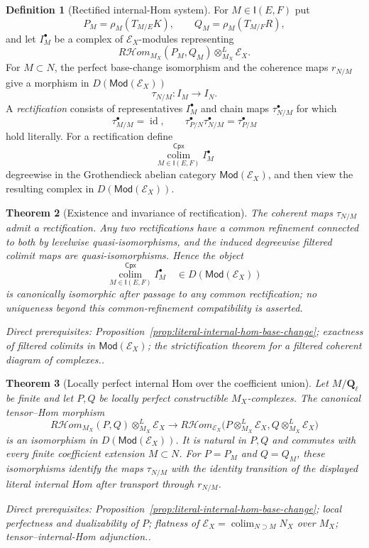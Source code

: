 \documentclass[10pt]{article}
\newtheorem{theorem}{Theorem}[section]
\theoremstyle{definition}
\newtheorem{definition}[theorem]{Definition}
\newcommand{\Ql}{\mathbf Q_\ell}
\newcommand{\depends}[1]{\par\smallskip\noindent\textit{Direct prerequisites:} #1.}
\begin{document}
\begin{definition}[Rectified internal-Hom system]
\label{def:rectified-internal-hom}
For $M\in\mathsf I(E,F)$ put
\[
 P_M=\rho_M(T_{M/E}K),\qquad Q_M=\rho_M(T_{M/F}R),
\]
and let $I_M^\bullet$ be a complex of $\mathcal E_X$-modules representing
\[
 R\mathcal Hom_{M_X}(P_M,Q_M)
 \otimes^L_{M_X}\mathcal E_X.
\]
For $M\subset N$, the perfect base-change isomorphism and the coherence
maps $r_{N/M}$ give a morphism in
$D(\mathsf{Mod}(\mathcal E_X))$
\[
 \tau_{N/M}:I_M\longrightarrow I_N.
\]
A \emph{rectification} consists of representatives $I_M^\bullet$ and chain
maps $\tau_{N/M}^\bullet$ for which
\[
 \tau_{M/M}^\bullet=\operatorname{id},\qquad
 \tau_{P/N}^\bullet\tau_{N/M}^\bullet=\tau_{P/M}^\bullet
\]
hold literally.  For a rectification define
\[
 \operatorname*{colim}^{\mathsf{Cpx}}_{M\in\mathsf I(E,F)}I_M^\bullet
\]
degreewise in the Grothendieck abelian category
$\mathsf{Mod}(\mathcal E_X)$, and then view the resulting complex in
$D(\mathsf{Mod}(\mathcal E_X))$.
\end{definition}

\begin{theorem}[Existence and invariance of rectification]
\label{thm:internal-hom-rectification}
The coherent maps $\tau_{N/M}$ admit a rectification.  Any two
rectifications have a common refinement connected to both by levelwise
quasi-isomorphisms, and the induced degreewise filtered colimit maps are
quasi-isomorphisms.  Hence the object
\[
 \operatorname*{colim}^{\mathsf{Cpx}}_{M\in\mathsf I(E,F)}I_M^\bullet
 \quad\in D(\mathsf{Mod}(\mathcal E_X))
\]
is canonically isomorphic after passage to any common rectification; no
uniqueness beyond this common-refinement compatibility is asserted.
\depends{Proposition~\ref{prop:literal-internal-hom-base-change}; exactness
of filtered colimits in $\mathsf{Mod}(\mathcal E_X)$; the strictification
theorem for a filtered coherent diagram of complexes.}
\end{theorem}

\begin{theorem}[Locally perfect internal Hom over the coefficient union]
\label{thm:literal-internal-hom-union}
Let $M/\Ql$ be finite and let $P,Q$ be locally perfect constructible
$M_X$-complexes.  The canonical tensor--Hom morphism
\[
 R\mathcal Hom_{M_X}(P,Q)\otimes^L_{M_X}\mathcal E_X
 \longrightarrow
 R\mathcal Hom_{\mathcal E_X}
 \bigl(P\otimes^L_{M_X}\mathcal E_X,
       Q\otimes^L_{M_X}\mathcal E_X\bigr)
\]
is an isomorphism in $D(\mathsf{Mod}(\mathcal E_X))$.  It is natural in
$P,Q$ and commutes with every finite coefficient extension $M\subset N$.
For $P=P_M$ and $Q=Q_M$, these isomorphisms identify the maps
$\tau_{N/M}$ with the identity transition of the displayed literal
internal Hom after transport through $r_{N/M}$.
\depends{Proposition~\ref{prop:literal-internal-hom-base-change}; local
perfectness and dualizability of $P$; flatness of
$\mathcal E_X=\operatorname*{colim}_{N\supset M}N_X$ over $M_X$;
tensor--internal-Hom adjunction.}
\end{theorem}
\end{document}
